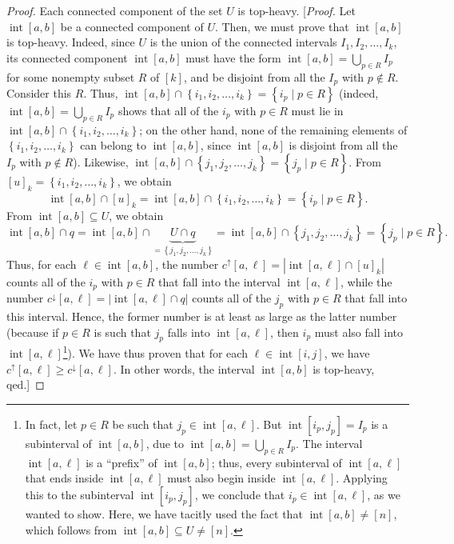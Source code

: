 \documentclass[reqno]{amsart}
\newcommand{\0}{\phantom{c}}
\DeclareMathOperator{\inter}{int} %
\let\cupnonlimits\bigcup
\renewcommand{\bigcup}{\cupnonlimits\limits}
\newenvironment{verlong}{}{}
\newcommand{\set}[1]{\left\{ #1 \right\}}
\newcommand{\abs}[1]{\left| #1 \right|}
\newcommand{\ive}[1]{\left[ #1 \right]}
\theoremstyle{plain}
\theoremstyle{definition}
\numberwithin{equation}{section}
\begin{document}
\begin{verlong}
\begin{proof}
Each connected component of the set $U$ is top-heavy.
[\textit{Proof.} Let $\inter[a,b]$ be a connected component of $U$. Then, we must prove that $\inter[a,b]$ is top-heavy.
Indeed, since $U$ is the union of the connected intervals $I_1, I_2, \ldots, I_k$, its connected component $\inter[a,b]$ must have the form $\inter[a,b] = \bigcup_{p \in R} I_p$ for some nonempty subset $R$ of $\ive{k}$, and be disjoint from all the $I_p$ with $p \notin R$. Consider this $R$.
Thus, $\inter[a,b] \cap \set{i_1, i_2, \ldots, i_k} = \set{i_p \mid p \in R}$ (indeed, $\inter[a,b] = \bigcup_{p \in R} I_p$ shows that all of the $i_p$ with $p \in R$ must lie in $\inter[a,b] \cap \set{i_1, i_2, \ldots, i_k}$; on the other hand, none of the remaining elements of $\set{i_1, i_2, \ldots, i_k}$ can belong to $\inter[a,b]$, since $\inter[a,b]$ is disjoint from all the $I_p$ with $p \notin R$).
Likewise, $\inter[a,b] \cap \set{j_1, j_2, \ldots, j_k} = \set{j_p \mid p \in R}$.
From $[u]_k = \set{i_1, i_2, \ldots, i_k}$, we obtain
\[
\inter[a,b] \cap [u]_k = \inter[a,b] \cap \set{i_1, i_2, \ldots, i_k} = \set{i_p \mid p \in R} .
\]
From $\inter[a,b] \subseteq U$, we obtain
\[
\inter[a,b] \cap q = \inter[a,b] \cap \underbrace{U \cap q}_{= \set{j_1, j_2, \ldots, j_k}}
= \inter[a,b] \cap \set{j_1, j_2, \ldots, j_k} = \set{j_p \mid p \in R} .
\]
Thus, for each $\ell \in \inter[a,b]$, the number $c^\uparrow[a,\ell] = \abs{\inter[a,\ell] \cap [u]_k}$ counts all of the $i_p$ with $p \in R$ that fall into the interval $\inter[a,\ell]$, while the number $c^\downarrow[a,\ell] = \abs{\inter[a,\ell] \cap q}$ counts all of the $j_p$ with $p \in R$ that fall into this interval.
Hence, the former number is at least as large as the latter number (because if $p \in R$ is such that $j_p$ falls into $\inter[a,\ell]$, then $i_p$ must also fall into $\inter[a,\ell]$\footnote{In fact, let $p \in R$ be such that $j_p \in \inter[a,\ell]$. But $\inter[i_p,j_p] = I_p$ is a subinterval of $\inter[a,b]$, due to $\inter[a,b] = \bigcup_{p \in R} I_p$. The interval $\inter[a,\ell]$ is a ``prefix'' of $\inter[a,b]$; thus, every subinterval of $\inter[a,\ell]$ that ends inside $\inter[a,\ell]$ must also begin inside $\inter[a,\ell]$. Applying this to the subinterval $\inter[i_p, j_p]$, we conclude that $i_p \in \inter[a,\ell]$, as we wanted to show. Here, we have tacitly used the fact that $\inter[a,b] \neq \ive{n}$, which follows from $\inter[a,b] \subseteq U \neq \ive{n}$.}).
We have thus proven that for each $\ell \in \inter[i,j]$, we have $c^\uparrow[a,\ell] \geq c^\downarrow[a,\ell]$. In other words, the interval $\inter[a,b]$ is top-heavy, qed.]


\end{proof}
\end{verlong}
\end{document}
